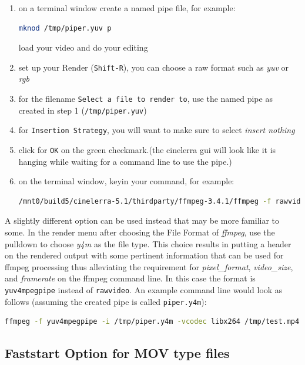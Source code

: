 \begin{enumerate}
    \item on a terminal window create a named pipe file, for example:
    \begin{lstlisting}[language=bash,numbers=none]
mknod /tmp/piper.yuv p
    \end{lstlisting}
    load your video and do your editing
    \item set up your Render (\texttt{Shift-R}), you can choose a raw format such as \textit{yuv} or \textit{rgb}
    \item for the filename \texttt{Select a file to render to}, use the named pipe as created in step 1 (\texttt{/tmp/piper.yuv})
    \item for \texttt{Insertion Strategy}, you will want to make sure to select \textit{insert nothing}
    \item click for \texttt{OK} on the green checkmark.(the cinelerra gui will look like it is hanging while waiting for a command line to use the pipe.)
    \item on the terminal window, keyin your command, for example:
    \begin{lstlisting}[language=bash,numbers=none]
/mnt0/build5/cinelerra-5.1/thirdparty/ffmpeg-3.4.1/ffmpeg -f rawvideo -pixel_format yuv420p \ -video_size 1280x720 -framerate 30000/1001 -i /tmp/piper.yuv /tmp/pys.mov
    \end{lstlisting}
\end{enumerate}

A slightly different option can be used instead that may be more familiar to some.  In the render menu after choosing the File Format of \textit{ffmpeg}, use the pulldown to choose \textit{y4m} as the file type.  This choice results in putting a header on the rendered output with some pertinent information that can be used for ffmpeg processing thus alleviating the requirement for \textit{pixel\_format}, \textit{video\_size}, and \textit{framerate} on the ffmpeg command line.  In this case the format is \texttt{yuv4mpegpipe} instead of \texttt{rawvideo}.  An example command line would look as follows (assuming the created pipe is called \texttt{piper.y4m}):
\begin{lstlisting}[language=bash,numbers=none]
ffmpeg -f yuv4mpegpipe -i /tmp/piper.y4m -vcodec libx264 /tmp/test.mp4
\end{lstlisting}

\subsection{Faststart Option for MOV type files}%
\label{sub:faststart_option_mov0}

